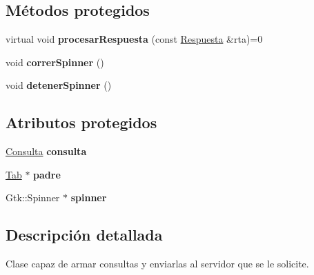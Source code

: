 \subsection*{\-Métodos protegidos}
\begin{DoxyCompactItemize}
\item 
\hypertarget{classConsultante_ab989a19350df309d7d131cd1daf5e581}{virtual void {\bfseries procesar\-Respuesta} (const \hyperlink{classRespuesta}{\-Respuesta} \&rta)=0}\label{classConsultante_ab989a19350df309d7d131cd1daf5e581}

\item 
\hypertarget{classConsultante_ac0c39ab1e0539a8c80de74d25d2d66de}{void {\bfseries correr\-Spinner} ()}\label{classConsultante_ac0c39ab1e0539a8c80de74d25d2d66de}

\item 
\hypertarget{classConsultante_a26e5dda94d1ad85b10bd192a9e7132b3}{void {\bfseries detener\-Spinner} ()}\label{classConsultante_a26e5dda94d1ad85b10bd192a9e7132b3}

\end{DoxyCompactItemize}
\subsection*{\-Atributos protegidos}
\begin{DoxyCompactItemize}
\item 
\hypertarget{classConsultante_ac21b1a3da7b9024590879d3b202258ea}{\hyperlink{classConsulta}{\-Consulta} {\bfseries consulta}}\label{classConsultante_ac21b1a3da7b9024590879d3b202258ea}

\item 
\hypertarget{classConsultante_ad518d43f57d3a5dcc3390fc8e9c355b9}{\hyperlink{classTab}{\-Tab} $\ast$ {\bfseries padre}}\label{classConsultante_ad518d43f57d3a5dcc3390fc8e9c355b9}

\item 
\hypertarget{classConsultante_afc0f657379fa256784bc65e8bc238725}{\-Gtk\-::\-Spinner $\ast$ {\bfseries spinner}}\label{classConsultante_afc0f657379fa256784bc65e8bc238725}

\end{DoxyCompactItemize}


\subsection{\-Descripción detallada}
\-Clase capaz de armar consultas y enviarlas al servidor que se le solicite.

